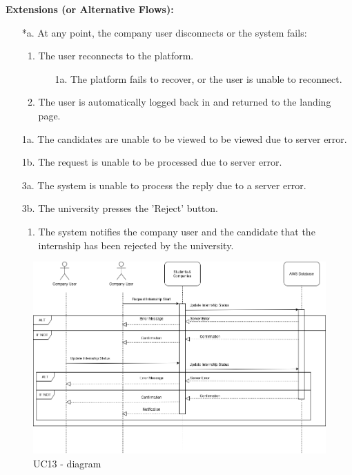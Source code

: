 \begin{itemize}[label={[\textbf{UC}]}, align=left, leftmargin=*]
    \textbf{Extensions (or Alternative Flows):} 
    \begin{enumerate}[label=\arabic*.]
        \item[*a.] At any point, the company user disconnects or the system fails:
            \begin{enumerate}[label=\arabic*.]
                \item The user reconnects to the platform.
                    \begin{enumerate}[label=\alph*.]
                        \item[1a.] The platform fails to recover, or the user is unable to reconnect.
                    \end{enumerate}
                 \item The user is automatically logged back in and returned to the landing page.
            \end{enumerate}
        \item[1a.] The candidates are unable to be viewed to be viewed due to server error.
        \item[1b.] The request is unable to be processed due to server error.
        \item[3a.] The system is unable to process the reply due to a server error. 
        \item[3b.] The university presses the 'Reject' button.
        \begin{enumerate}[label=\arabic*.]
                \item The system notifies the company user and the candidate that the internship has been rejected by the university.
            \end{enumerate}
        
        \end{enumerate}

        
     \begin{figure}[H]
    	\includegraphics[width=\textwidth,height=\textheight,keepaspectratio]{RASD-Latex/assets/Use Case Diagrams/UC13.png}
    	\caption{UC13 - diagram}
    	\label{fig:DataRequest}
    \end{figure}



\end{itemize}
